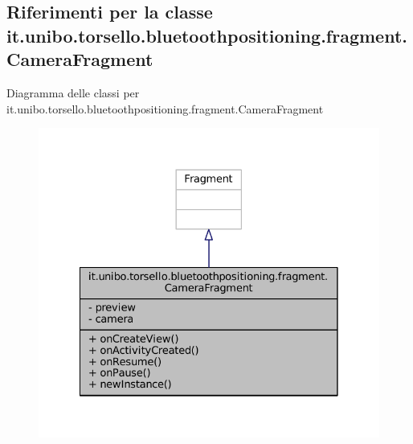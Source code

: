 \hypertarget{classit_1_1unibo_1_1torsello_1_1bluetoothpositioning_1_1fragment_1_1CameraFragment}{}\subsection{Riferimenti per la classe it.\+unibo.\+torsello.\+bluetoothpositioning.\+fragment.\+Camera\+Fragment}
\label{classit_1_1unibo_1_1torsello_1_1bluetoothpositioning_1_1fragment_1_1CameraFragment}


Diagramma delle classi per it.\+unibo.\+torsello.\+bluetoothpositioning.\+fragment.\+Camera\+Fragment
\nopagebreak
\begin{figure}[H]
\begin{center}
\leavevmode
\includegraphics[width=328pt]{classit_1_1unibo_1_1torsello_1_1bluetoothpositioning_1_1fragment_1_1CameraFragment__inherit__graph}
\end{center}
\end{figure}


